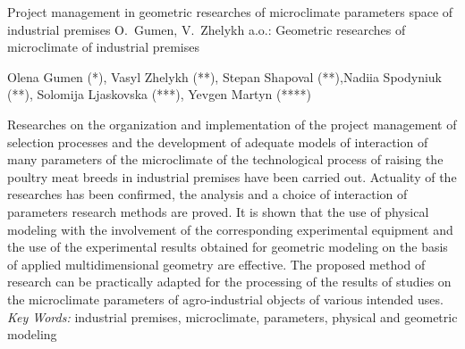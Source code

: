 \documentclass[12pt,twoside]{article}
\begin{document}
	\begin{JGGarticle}
		{Project management in geometric researches of microclimate parameters space of industrial premises}
		{O.\ Gumen, V.\ Zhelykh a.o.: Geometric researches of microclimate of industrial premises}
		{\parbox{\textwidth}{\noindent\centering Olena Gumen (*), Vasyl Zhelykh (**), Stepan Shapoval (**),Nadiia Spodyniuk (**),
							 Solomija Ljaskovska (***), Yevgen Martyn (****)}}
		{
		}
		
		\begin{JGGabstract}
			Researches on the organization and implementation of the project management of selection processes and the development of adequate models of interaction of many parameters of the microclimate of the technological process of raising the poultry meat breeds in industrial premises have been carried out. Actuality of the researches has been confirmed, the analysis and a choice of interaction of parameters research methods are proved. It is shown that the use of physical modeling with the involvement of the corresponding experimental equipment and the use of the experimental results obtained for geometric modeling on the basis of applied multidimensional geometry are effective. The proposed method of research can be practically adapted for the processing of the results of studies on the microclimate parameters of agro-industrial objects of various intended uses.
			\\[1mm]{\em Key Words:} industrial premises, microclimate, parameters, physical and geometric modeling
		\end{JGGabstract}
		

\end{JGGarticle}
\end{document}
